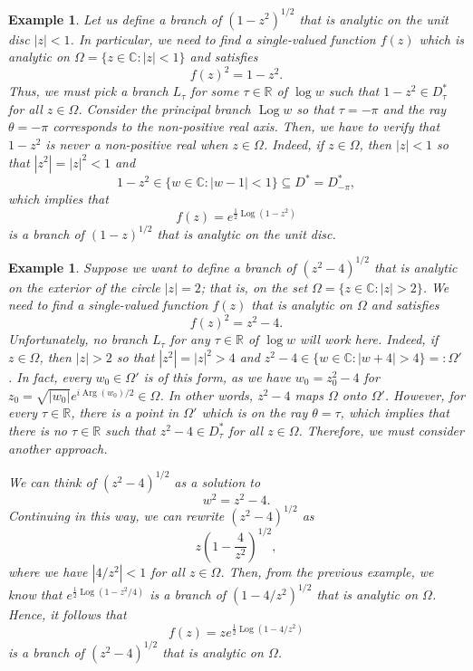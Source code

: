 \documentclass[10pt]{article}
\newcommand{\R}{\mathbb{R}}
\newcommand{\C}{\mathbb{C}}
\DeclareMathOperator{\Arg}{Arg}
\DeclareMathOperator{\Log}{Log}
\theoremstyle{newstyle}
\newtheorem{exmp}[thm]{Example}
\begin{document}
\begin{exmp}
Let us define a branch of $(1-z^2)^{1/2}$ that is analytic on the unit disc $|z| < 1$. 
In particular, we need to find a single-valued function $f(z)$ which is analytic on 
$\Omega = \{z \in \C : |z| < 1\}$ and satisfies 
\[ f(z)^2 = 1-z^2. \]
Thus, we must pick a branch $L_\tau$ for some $\tau \in \R$ of $\log w$ such that $1-z^2 \in 
D_\tau^*$ for all $z \in \Omega$. Consider the principal branch $\Log w$ so that 
$\tau = -\pi$ and the ray $\theta = -\pi$ corresponds to the non-positive real axis. 
Then, we have to verify that $1-z^2$ is never a non-positive real when $z \in \Omega$. 
Indeed, if $z \in \Omega$, then $|z| < 1$ so that $|z^2| = |z|^2 < 1$ and 
\[ 1 - z^2 \in \{w \in \C : |w-1| < 1\} \subseteq D^* = D_{-\pi}^*, \]
which implies that 
\[ f(z) = e^{\frac12\Log(1-z^2)} \]
is a branch of $(1-z)^{1/2}$ that is analytic on the unit disc. 
\end{exmp}

\begin{exmp}
Suppose we want to define a branch of $(z^2 - 4)^{1/2}$ that is analytic on the exterior of the 
circle $|z| = 2$; that is, on the set $\Omega = \{z \in \C : |z| > 2\}$. We need to find a 
single-valued function $f(z)$ that is analytic on $\Omega$ and satisfies 
\[ f(z)^2 = z^2 - 4. \] 
Unfortunately, no branch $L_\tau$ for any $\tau \in \R$ of $\log w$ will work here. 
Indeed, if $z \in \Omega$, then $|z| > 2$ so that $|z^2| = |z|^2 > 4$ and 
$z^2 - 4 \in \{w \in \C : |w+4| > 4\} =: \Omega'$. In fact, every $w_0 \in \Omega'$ is of 
this form, as we have $w_0 = z_0^2 - 4$ for $z_0 = \sqrt{|w_0|} e^{i \Arg(w_0)/2} \in \Omega$. 
In other words, $z^2 - 4$ maps $\Omega$ onto $\Omega'$. However, for every $\tau \in \R$, 
there is a point in $\Omega'$ which is on the ray $\theta = \tau$, which implies that 
there is no $\tau \in \R$ such that $z^2 - 4 \in D_\tau^*$ for all $z \in \Omega$. 
Therefore, we must consider another approach. 

We can think of $(z^2 - 4)^{1/2}$ as a solution to 
\[ w^2 = z^2 - 4. \]
Continuing in this way, we can rewrite $(z^2 - 4)^{1/2}$ as 
\[ z \left( 1 - \frac4{z^2} \right)^{1/2}, \]
where we have $|4/z^2| < 1$ for all $z \in \Omega$. Then, from the previous example, we know that 
$e^{\frac12 \Log(1-z^2/4)}$ is a branch of $(1-4/z^2)^{1/2}$ that is analytic on $\Omega$. 
Hence, it follows that 
\[ f(z) = ze^{\frac12\Log(1-4/z^2)} \]
is a branch of $(z^2 - 4)^{1/2}$ that is analytic on $\Omega$. 
\end{exmp}
\end{document}
